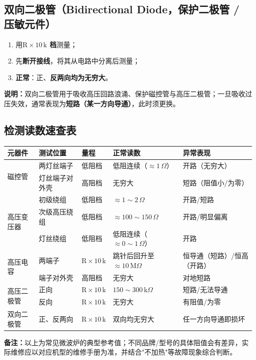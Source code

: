 \documentclass[12pt,a4paper]{ctexbook}
\begin{document}
\subsection{双向二极管（Bidirectional Diode，保护二极管 / 压敏元件）}
\begin{enumerate}
  \item 用\textbf{$\mathrm{R}\times10\,\mathrm{k}$ 档}测量；
  \item 先\textbf{断开接线}，将其从电路中分离后测量；
  \item \textbf{正常}：正、\textbf{反两向均为无穷大}。
\end{enumerate}
\textbf{说明：}双向二极管用于吸收高压回路浪涌、保护磁控管与高压二极管；一旦吸收过压失效，通常表现为\textbf{短路（某一方向导通）}，此时须更换。

\subsection*{检测读数速查表}
\begin{landscape}
\begin{center}
\footnotesize
\renewcommand{\arraystretch}{1.4}
\setlength{\tabcolsep}{4pt}
\begin{tabular}{|p{2.8cm}|p{3.2cm}|p{3.0cm}|p{7.0cm}|p{7.0cm}|}
\hline
\textbf{元器件} & \textbf{测试位置} & \textbf{量程} & \textbf{正常读数} & \textbf{异常表现} \\ \hline
\multirow{2}{2.8cm}{\centering 磁控管} & 两灯丝端子 & 低阻档 & 低阻连续（$\approx 1\,\Omega$） & 开路（无穷大） \\
\cline{2-5}
& 灯丝端子对外壳 & 高阻档 & 无穷大 & 短路（阻值小/为零） \\ \hline
\multirow{3}{2.8cm}{\centering 高压变压器} & 初级绕组 & 低阻档 & $\approx 1\sim2\,\Omega$ & 开路/短路 \\
\cline{2-5}
& 次级高压绕组 & 低阻档 & $\approx 100\sim150\,\Omega$ & 开路/明显偏离 \\
\cline{2-5}
& 灯丝绕组 & 低阻档 & 低阻连续（$\approx 0\sim1\,\Omega$） & 开路 \\ \hline
\multirow{2}{2.8cm}{\centering 高压电容} & 两端子 & $\mathrm{R}\times10\,\mathrm{k}$ & 跳针后回升至 $\approx 10\,\mathrm{M}\Omega$ & 恒导通（短路）/恒高（开路） \\
\cline{2-5}
& 端子对外壳 & 高阻档 & 无穷大 & 对地短路 \\ \hline
\multirow{2}{2.8cm}{\centering 高压二极管} & 正向 & $\mathrm{R}\times10\,\mathrm{k}$ & $150\sim300\,\mathrm{k}\Omega$ & 短路/无法导通 \\
\cline{2-5}
& 反向 & $\mathrm{R}\times10\,\mathrm{k}$ & 无穷大 & 有阻值/为零 \\ \hline
双向二极管 & 正、反两向 & $\mathrm{R}\times10\,\mathrm{k}$ & 双向均无穷大 & 任一方向导通即损坏 \\ \hline
\end{tabular}
\end{center}
\end{landscape}

\textbf{备注：}以上为常见微波炉的典型参考值；不同品牌/型号的具体阻值会有差异，实际维修应以对应机型的维修手册为准，并结合"不加热"等故障现象综合判断。
\end{document}
